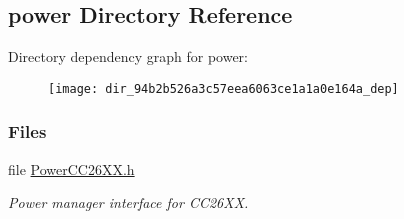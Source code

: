 \subsection{power Directory Reference}
\label{dir_94b2b526a3c57eea6063ce1a1a0e164a}
Directory dependency graph for power\+:
\nopagebreak
\begin{figure}[H]
\begin{center}
\leavevmode
\texttt{[image: dir\_94b2b526a3c57eea6063ce1a1a0e164a\_dep]}
\end{center}
\end{figure}
\subsubsection*{Files}
\begin{DoxyCompactItemize}
\item 
file \hyperlink{_power_c_c26_x_x_8h}{Power\+C\+C26\+X\+X.\+h}
\begin{DoxyCompactList}\small\item\em Power manager interface for C\+C26\+X\+X. \end{DoxyCompactList}\end{DoxyCompactItemize}
